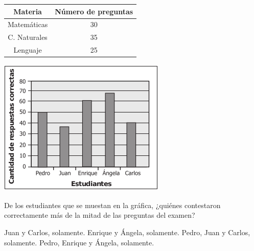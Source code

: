 \documentclass[10pt,addpoints]{exam}
\begin{document}
\begin{multicols}{2}
\begin{questions}
\begin{tabular}{|c|c|}
\hline 
Materia & Número de preguntas \\ 
\hline 
Matemáticas & 30 \\ 
\hline 
C. Naturales & 35 \\ 
\hline 
Lenguaje & 25 \\ 
\hline 
\end{tabular}
\begin{center}
\includegraphics[scale=.6]{Images/Pantallazo-18.png} 
\end{center}
De los estudiantes que se muestan en la gráfica, ¿quiénes contestaron correctamente más de la mitad de las preguntas del examen?
\begin{choices}
\choice Juan y Carlos, solamente.
\choice Enrique y Ángela, solamente.
\choice Pedro, Juan y Carlos, solamente.
\CorrectChoice Pedro, Enrique y Ángela, solamente.
\end{choices}
\end{questions}
\end{multicols}
\end{document}
